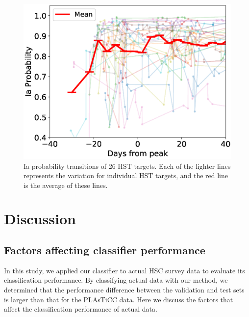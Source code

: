 \documentclass[useamsfonts]{pasj01}
\begin{document}
%
%
\begin{figure}[htbp]
  \begin{center}
     \includegraphics[width=\columnwidth]{figures/HST_DaysFromPeak_vs_IaProbability_200319.eps}
  \end{center}
  \caption{%
  Ia probability transitions of 26 HST targets. Each of the lighter lines represents the variation for individual HST targets, and the red line is the average of these lines.
  }%
  \label{fig:HSTIaprob}
\end{figure}
%
%
\section{Discussion}
%
\subsection{Factors affecting classifier performance}
%
In this study, we applied our classifier to actual HSC survey data to evaluate its classification performance.
By classifying actual data with our method, we determined that the performance difference between the validation and test sets is larger than that for the PLAsTiCC data.
Here we discuss the factors that affect the classification performance of actual data.
\end{document}
